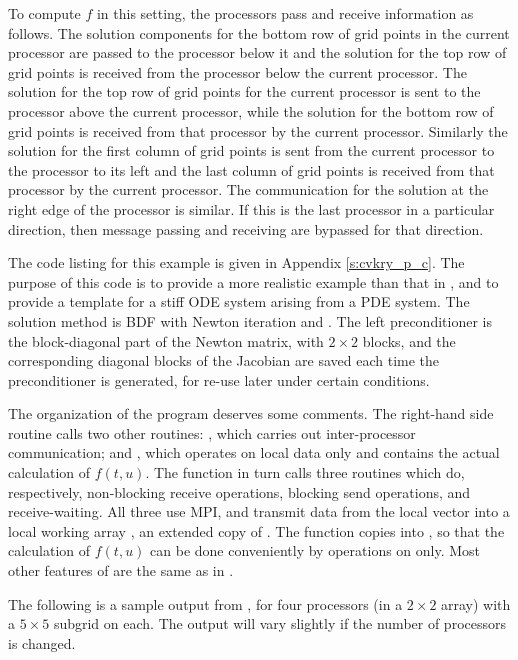 To compute $f$ in this setting, the processors pass and receive
information as follows.  The solution components for the bottom row of
grid points in the current processor are passed to the processor below
it and the solution for the top row of grid points is received from
the processor below the current processor. The solution for the top
row of grid points for the current processor is sent to the processor
above the current processor, while the solution for the bottom row of
grid points is received from that processor by the current
processor. Similarly the solution for the first column of grid points
is sent from the current processor to the processor to its left and
the last column of grid points is received from that processor by the
current processor. The communication for the solution at the right
edge of the processor is similar. If this is the last processor in a
particular direction, then message passing and receiving are bypassed
for that direction.

The code listing for this example is given in Appendix \ref{s:cvkry_p_c}.
The purpose of this code is to provide a more realistic example than
that in , and to provide a template for a stiff ODE system
arising from a PDE system. The solution method is BDF with Newton
iteration and {\spgmr}. The left preconditioner is the block-diagonal
part of the Newton matrix, with $2 \times 2$ blocks, and the
corresponding diagonal blocks of the Jacobian are saved each time the
preconditioner is generated, for re-use later under certain conditions.

The organization of the  program deserves some comments. The
right-hand side routine  calls two other routines: , which
carries out inter-processor communication; and , which operates on
local data only and contains the actual calculation of $f(t,u)$. The 
 function in turn calls three routines which do, respectively,
non-blocking receive operations, blocking send operations, and
receive-waiting. All three use MPI, and transmit data from the local 
vector into a local working array , an extended copy of .
The  function copies  into , so that the
calculation of $f(t,u)$ can be done conveniently by operations on 
 only.  Most other features of  are the same as in
.

The following is a sample output from , for four processors
(in a $2 \times 2$ array) with a $5 \times 5$ subgrid on each.
The output will vary slightly if the number of processors is changed.

